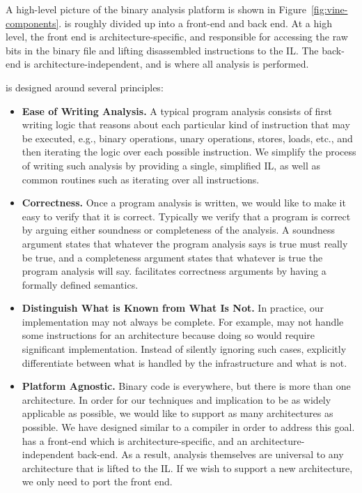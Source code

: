 A high-level picture of the \bap binary analysis platform is shown in
Figure~\ref{fig:vine-components}.  \bap is roughly divided up into a
front-end and back end.  At a high level, the front end is
architecture-specific, and responsible for accessing the raw bits in
the binary file and lifting disassembled instructions to the \bap
IL. The back-end is architecture-independent, and is where all
analysis is performed.

\bap is designed around several principles:
\begin{itemize}\squish

\item {\bf Ease of Writing Analysis.}  A typical program analysis
  consists of first writing logic that reasons about each particular
  kind of instruction that may be executed, e.g., binary operations,
  unary operations, stores, loads, etc., and then iterating the logic
  over each possible instruction. We simplify the process of writing
  such analysis by providing a single, simplified IL, as well as
  common routines such as iterating over all instructions.

\item {\bf Correctness.}  Once a program analysis is written, we would
  like to make it easy to verify that it is correct. Typically we
  verify that a program is correct by arguing either soundness or
  completeness of the analysis.  A soundness argument states that
  whatever the program analysis says is true must really be true, and
  a completeness argument states that whatever is true the program
  analysis will say.  \bap facilitates correctness arguments by
  having a formally defined semantics.

\item {\bf Distinguish What is Known from What Is Not.}  In practice,
  our implementation may not always be complete.  For example, \bap
  may not handle some instructions for an architecture because doing
  so would require significant implementation.  Instead of silently
  ignoring such cases, \bap explicitly differentiate between what is
  handled by the infrastructure and what is not.

\item {\bf Platform Agnostic.} Binary code is everywhere, but there is
  more than one architecture. In order for our techniques and
  implication to be as widely applicable as possible, we would like to
  support as many architectures as possible.  We have designed \bap
  similar to a compiler in order to address this goal.  \bap has a
  front-end which is architecture-specific, and an
  architecture-independent back-end. As a result, analysis themselves
  are universal to any architecture that is lifted to the \bap IL.
  If we wish to support a new architecture, we only need to port the
  front end.


\end{itemize}
